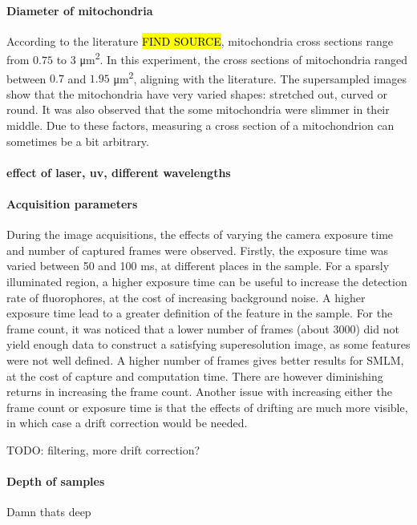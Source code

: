 \paragraph{Diameter of mitochondria}
According to the literature \hl{FIND SOURCE}, mitochondria cross sections range from $0.75$ to $3$ \si{\micro\meter\squared}. In this experiment, the cross sections of mitochondria ranged between $0.7$ and $1.95$ \si{\micro\meter\squared}, aligning with the literature. The supersampled images show that the mitochondria have very varied shapes: stretched out, curved or round. It was also observed that the some mitochondria were slimmer in their middle. Due to these factors, measuring a cross section of a mitochondrion can sometimes be a bit arbitrary.

\paragraph{effect of laser, uv, different wavelengths}

\paragraph{Acquisition parameters}
During the image acquisitions, the effects of varying the camera exposure time and number of captured frames were observed. Firstly, the exposure time was varied between 50 and 100 ms, at different places in the sample. For a sparsly illuminated region, a higher exposure time can be useful to increase the detection rate of fluorophores, at the cost of increasing background noise. A higher exposure time lead to a greater definition of the feature in the sample. For the frame count, it was noticed that a lower number of frames (about 3000) did not yield enough data to construct a satisfying superesolution image, as some features were not well defined. A higher number of frames gives better results for SMLM, at the cost of capture and computation time. There are however diminishing returns in increasing the frame count. Another issue with increasing either the frame count or exposure time is that the effects of drifting are much more visible, in which case a drift correction would be needed.

TODO: filtering, more drift correction?

\paragraph{Depth of samples}
Damn thats deep